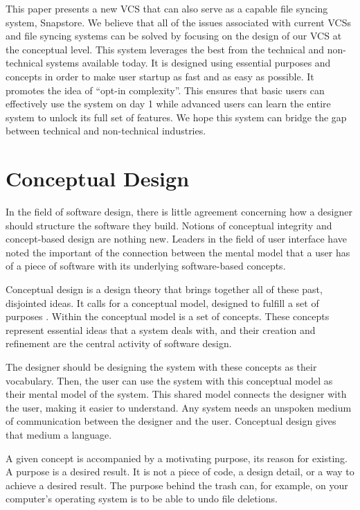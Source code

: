 This paper presents a new VCS that can also serve as a capable file syncing system, Snapstore. We believe that all of the issues associated with current VCSs and file syncing systems can be solved by focusing on the design of our VCS at the conceptual level. This system leverages the best from the technical and non-technical systems available today. It is designed using essential purposes and concepts in order to make user startup as fast and as easy as possible. It promotes the idea of ``opt-in complexity''. This ensures that basic users can effectively use the system on day 1 while advanced users can learn the entire system to unlock its full set of features. We hope this system can bridge the gap between technical and non-technical industries. 

\section{Conceptual Design}

In the field of software design, there is little agreement concerning how a designer should structure the software they build. Notions of conceptual integrity and concept-based design are nothing new. Leaders in the field of user interface have noted the important of the connection between the mental model that a user has of a piece of software with its underlying software-based concepts. 

Conceptual design is a design theory that brings together all of these past, disjointed ideas. It calls for a conceptual model, designed to fulfill a set of purposes \cite{Jackson}. Within the conceptual model is a set of concepts. These concepts represent essential ideas that a system deals with, and their creation and refinement are the central activity of software design.

The designer should be designing the system with these concepts as their vocabulary. Then, the user can use the system with this conceptual model as their mental model of the system. This shared model connects the designer with the user, making it easier to understand. Any system needs an unspoken medium of communication between the designer and the user. Conceptual design gives that medium a language.

A given concept is accompanied by a motivating purpose, its reason for existing. A purpose is a desired result. It is not a piece of code, a design detail, or a way to achieve a desired result. The purpose behind the trash can, for example, on your computer's operating system is to be able to undo file deletions.

